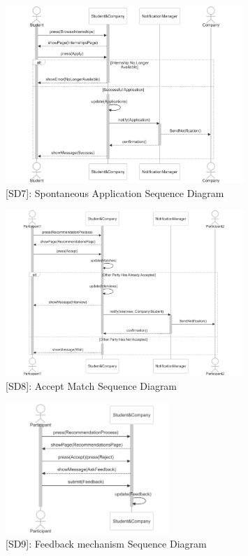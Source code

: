\begin{figure}
    \centering
    \includegraphics[width=0.8\textwidth]{Latex/Images/RASD/SequenceDiagrams/SpontaneousApplicationSequenceDiagram.png}
    \caption{[SD7]: Spontaneous Application Sequence Diagram}
    \label{fig:SD7}
\end{figure}

\begin{figure}
    \centering
    \includegraphics[width=0.8\textwidth]{Latex/Images/RASD/SequenceDiagrams/AcceptMatchSequenceDiagram.png}
    \caption{[SD8]: Accept Match Sequence Diagram}
    \label{fig:SD8}
\end{figure}
\clearpage

\begin{figure}
    \centering
    \includegraphics[width=0.55\textwidth]{Latex/Images/RASD/SequenceDiagrams/FeedbackMechanismSequenceDiagram.png}
    \caption{[SD9]: Feedback mechanism Sequence Diagram}
    \label{fig:SD9}
\end{figure}

